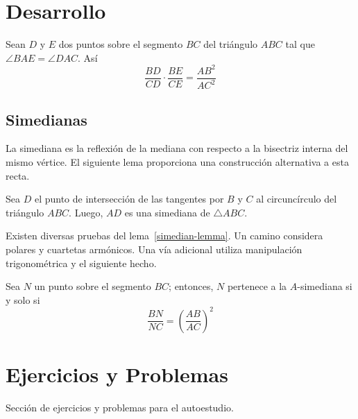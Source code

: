 \section{Desarrollo}

\begin{section-theorem.tcb}[Steiner]
    Sean $D$ y $E$ dos puntos sobre el segmento $BC$ del triángulo $ABC$ tal que $\angle BAE = \angle DAC$.
    Así
    \[\frac{BD}{CD} \cdot \frac{BE}{CE} = \frac{AB^2}{AC^2}\]
\end{section-theorem.tcb}

\subsection{Simedianas}

La simediana es la reflexión de la mediana con respecto a la bisectriz interna del mismo vértice.
El siguiente lema proporciona una construcción alternativa a esta recta.

\begin{section-lemma.tcb}\label{simedian-lemma}
    Sea $D$ el punto de intersección de las tangentes por $B$ y $C$ al circuncírculo del triángulo $ABC$.
    Luego, $AD$ es una simediana de $\triangle ABC$.
\end{section-lemma.tcb}

Existen diversas pruebas del lema~\ref{simedian-lemma}.
Un camino considera polares y cuartetas armónicos.
Una vía adicional utiliza manipulación trigonométrica y el siguiente hecho.

\begin{section-lemma.tcb}
    Sea $N$ un punto sobre el segmento $BC$; entonces, $N$ pertenece a la $A$\nobreakdash-simediana si y solo si
    \[\frac{BN}{NC} = \left(\frac{AB}{AC}\right)^2\]
\end{section-lemma.tcb}

\section{Ejercicios y Problemas}
{
    Sección de ejercicios y problemas para el autoestudio.
}